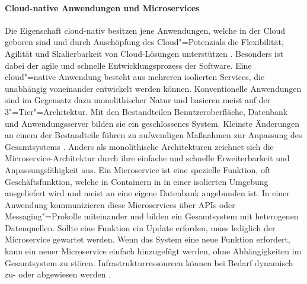 \paragraph{Cloud-native Anwendungen und Microservices}

Die Eigenschaft cloud-nativ besitzen jene Anwendungen, welche in der Cloud \glqq geboren\grqq{} sind und durch Auschöpfung des Cloud"=Potenzials die Flexibilität, Agilität und Skalierbarkeit von Cloud-Lösungen unterstützen \citep{Acharya2019}. Besonders ist dabei der agile und schnelle Entwicklungsprozess der Software. Eine cloud"=native Anwendung besteht aus mehreren isolierten Services, die unabhängig voneinander entwickelt werden können. Konventionelle Anwendungen sind im Gegensatz dazu monolithischer Natur und basieren meist auf der 3"=Tier"=Architektur. Mit den Bestandteilen Benutzeroberfläche, Datenbank und Anwendungsserver bilden sie ein geschlossenes System. Kleinste Änderungen an einem der Bestandteile führen zu aufwendigen Maßnahmen zur Anpassung des Gesamtsystems \citep{Utecht2018}.
Anders als monolithische Architekturen zeichnet sich die Microservice-Architektur durch ihre einfache und schnelle Erweiterbarkeit und Anpassungsfähigkeit aus. Ein Microservice ist eine spezielle Funktion, oft Geschäftsfunktion, welche in Containern in in einer isolierten Umgebung ausgeliefert wird und meist an eine eigene Datenbank angebunden ist. In einer Anwendung kommunizieren diese Microservices über APIs oder Messaging"=Prokolle miteinander und bilden ein Gesamtsystem mit heterogenen Datenquellen. Sollte eine Funktion ein Update erforden, muss lediglich der Microservice  gewartet werden. Wenn das System eine neue Funktion erfordert, kann ein neuer Microservice einfach hinzugefügt werden, ohne Abhängigkeiten im Gesamtsystem zu stören. Infrastrukturressourcen können bei Bedarf dynamisch zu- oder abgewiesen werden \citep{Acharya2019}.


